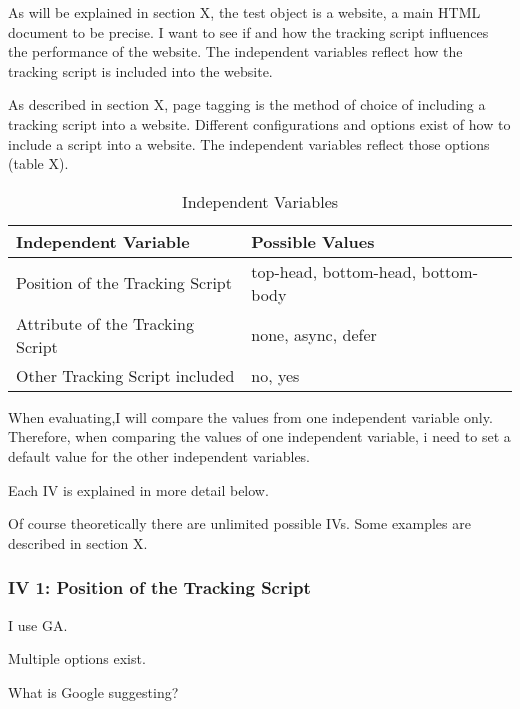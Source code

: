 
As will be explained in section X, the test object is a website, a main HTML document to be precise.
I want to see if and how the tracking script influences the performance of the website.
The independent variables reflect how the tracking script is included into the website.


As described in section X, page tagging is the method of choice of including a tracking script into a website.
Different configurations and options exist of how to include a script into a website.
The independent variables reflect those options (table X).

\begin{table}[h]
	\small
	\centering
	\begin{tabular}{ | l | l | }
	\hline
	Independent Variable \cellcolor{lightgrey} & Possible Values \cellcolor{lightgrey} \\
	\hline
	Position of the Tracking Script & top-head, bottom-head, bottom-body \\
	Attribute of the Tracking Script & none, async, defer \\
	Other Tracking Script included & no, yes \\
	\hline
	\end{tabular}
	\medskip
	\caption{Independent Variables}
	\label{table:independent_variables}
\end{table}


When evaluating,I will compare the values from one independent variable only.
Therefore, when comparing the values of one independent variable, i need to set a default value for the other independent variables.

Each IV is explained in more detail below.

Of course theoretically there are unlimited possible IVs.
Some examples are described in section X.


\subsubsection{IV 1: Position of the Tracking Script}

I use GA.

Multiple options exist.

What is Google suggesting?


